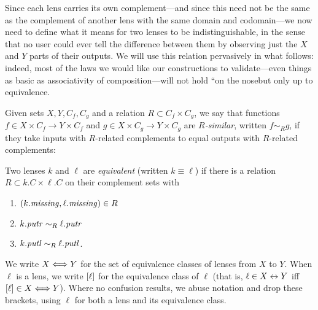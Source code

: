 \iftext 
Since each lens carries its own complement---and since this need
not be the same as the 
complement of another lens with the same domain and codomain---we now need to
define what it means for two lenses to be indistinguishable, in the sense
that no user could ever tell the difference between them by observing just the
$X$ and $Y$ parts of their outputs.  We will use this relation pervasively
in what follows: indeed, most of the laws we would like our constructions to
validate---even things as basic as associativity of composition---will not
hold ``on the nose\commaquote but only up to equivalence. 
\fi

\iffull
\begin{defn}[$R$-similarity]
\else
\begin{defn}
\fi
Given \iffull sets \fi $X,Y,C_f,C_g$ and a relation $R \subset C_f \times C_g$,
we say that functions 
$f \in X \times C_f \to Y \times C_f$ and $g \in X \times C_g \to Y \times C_g$
are {\em $R$-similar}, written $f \sim_R g$, if they take inputs with $R$-related
complements to equal outputs with $R$-related complements:
\end{defn}

\begin{defn}
Two lenses $k$ and $\ell$ are {\em equivalent} (written $k \equiv \ell$) if
there is a relation $R \subset k.C \times \ell.C$ \iffull on their complement
sets \fi with
\begin{enumerate}
    \item $(k.\mathit{missing}, \ell.\mathit{missing}) \in R$
    \item $k.\mathit{putr} \sim_R \ell.\mathit{putr}$
    \item $k.\mathit{putl} \sim_R \ell.\mathit{putl}$.
\end{enumerate}
We write $X \Longleftrightarrow Y$ for the set of equivalence classes of lenses from $X$
to $Y$.  When $\ell$ is a lens, we write $[\ell]$ for the
equivalence class of $\ell$ (that is, $\ell \in X\leftrightarrow Y$ iff
$[\ell] \in X\Longleftrightarrow Y$).  Where no confusion results, we 
abuse notation and drop these brackets, using $\ell$ for both a lens and
its equivalence class.
\end{defn}


\end{defn}
